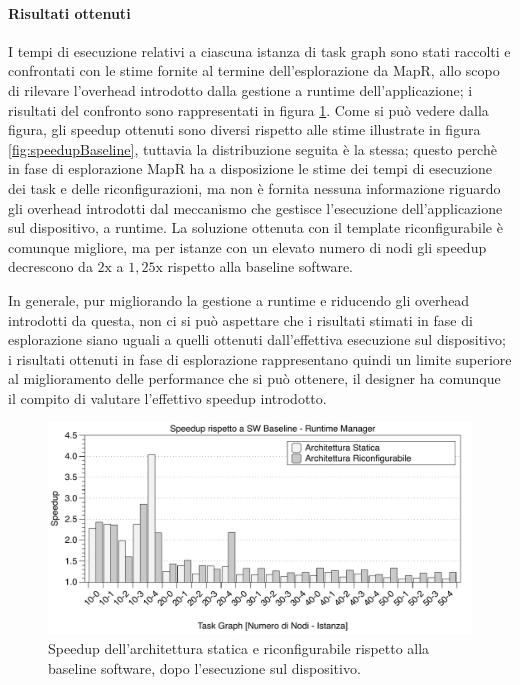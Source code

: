 \paragraph{Risultati ottenuti}
I tempi di esecuzione relativi a ciascuna istanza di task graph sono stati raccolti e confrontati
con le stime fornite al termine dell'esplorazione da MapR, allo scopo di rilevare l'overhead
introdotto dalla gestione a runtime dell'applicazione; i risultati del confronto sono
rappresentati in figura \ref{fig:speedupBaselineRuntime}.
Come si pu\`o vedere dalla figura, gli speedup ottenuti sono diversi rispetto alle stime
illustrate in figura \ref{fig:speedupBaseline}, tuttavia la distribuzione seguita \`e la stessa;
questo perch\`e in fase di esplorazione MapR ha a disposizione le stime dei tempi di esecuzione
dei task e delle riconfigurazioni, ma non \`e fornita nessuna informazione riguardo gli overhead
introdotti dal meccanismo che gestisce l'esecuzione dell'applicazione sul dispositivo, a runtime.
La soluzione ottenuta con il template riconfigurabile \`e comunque migliore, ma per istanze
con un elevato numero di nodi gli speedup decrescono da $2\text{x}$ a $1,25\text{x}$ rispetto alla
baseline software.

In generale, pur migliorando la gestione a runtime e riducendo gli overhead introdotti da questa,
non ci si pu\`o aspettare che i risultati stimati in fase di esplorazione siano uguali a quelli ottenuti
dall'effettiva esecuzione sul dispositivo; i risultati ottenuti in fase di esplorazione rappresentano quindi
un limite superiore al miglioramento delle performance che si pu\`o ottenere, il designer ha comunque il compito
di valutare l'effettivo speedup introdotto.

\begin{figure}[t]
 \begin{center}
  \includegraphics[width=\textwidth]{./capitoli/figure/cap6/FPL_Runtime.pdf}
  \caption{Speedup dell'architettura statica e riconfigurabile rispetto alla
  baseline software, dopo l'esecuzione sul dispositivo.}
  \label{fig:speedupBaselineRuntime}
 \end{center}
\end{figure}


